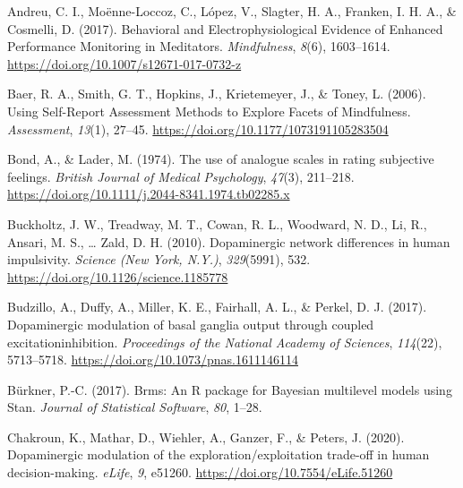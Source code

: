 \documentclass[
  man]{apa6}
\newlength{\cslhangindent}
\newlength{\cslentryspacingunit} %
\newenvironment{CSLReferences}[2] %
 {%
  \setlength{\parindent}{0pt}
  \ifodd #1
  \let\oldpar\par
  \def\par{\hangindent=\cslhangindent\oldpar}
  \fi
  \setlength{\parskip}{#2\cslentryspacingunit}
 }%
 {}
\begin{document}
\hypertarget{refs}{}
\begin{CSLReferences}{1}{0}
\leavevmode{}%
Andreu, C. I., Moënne-Loccoz, C., López, V., Slagter, H. A., Franken, I. H. A., \& Cosmelli, D. (2017). Behavioral and {Electrophysiological Evidence} of {Enhanced Performance Monitoring} in {Meditators}. \emph{Mindfulness}, \emph{8}(6), 1603--1614. \url{https://doi.org/10.1007/s12671-017-0732-z}

\leavevmode{}%
Baer, R. A., Smith, G. T., Hopkins, J., Krietemeyer, J., \& Toney, L. (2006). Using {Self-Report Assessment Methods} to {Explore Facets} of {Mindfulness}. \emph{Assessment}, \emph{13}(1), 27--45. \url{https://doi.org/10.1177/1073191105283504}

\leavevmode{}%
Bond, A., \& Lader, M. (1974). The use of analogue scales in rating subjective feelings. \emph{British Journal of Medical Psychology}, \emph{47}(3), 211--218. \url{https://doi.org/10.1111/j.2044-8341.1974.tb02285.x}

\leavevmode{}%
Buckholtz, J. W., Treadway, M. T., Cowan, R. L., Woodward, N. D., Li, R., Ansari, M. S., \ldots{} Zald, D. H. (2010). Dopaminergic network differences in human impulsivity. \emph{Science (New York, N.Y.)}, \emph{329}(5991), 532. \url{https://doi.org/10.1126/science.1185778}

\leavevmode{}%
Budzillo, A., Duffy, A., Miller, K. E., Fairhall, A. L., \& Perkel, D. J. (2017). Dopaminergic modulation of basal ganglia output through coupled excitation\textendash inhibition. \emph{Proceedings of the National Academy of Sciences}, \emph{114}(22), 5713--5718. \url{https://doi.org/10.1073/pnas.1611146114}

\leavevmode{}%
Bürkner, P.-C. (2017). Brms: {An R} package for {Bayesian} multilevel models using {Stan}. \emph{Journal of Statistical Software}, \emph{80}, 1--28.

\leavevmode{}%
Chakroun, K., Mathar, D., Wiehler, A., Ganzer, F., \& Peters, J. (2020). Dopaminergic modulation of the exploration/exploitation trade-off in human decision-making. \emph{eLife}, \emph{9}, e51260. \url{https://doi.org/10.7554/eLife.51260}


\end{CSLReferences}
\end{document}
